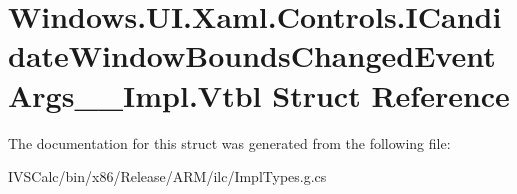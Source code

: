 \hypertarget{struct_windows_1_1_u_i_1_1_xaml_1_1_controls_1_1_i_candidate_window_bounds_changed_event_args_____impl_1_1_vtbl}{}\section{Windows.\+U\+I.\+Xaml.\+Controls.\+I\+Candidate\+Window\+Bounds\+Changed\+Event\+Args\+\_\+\+\_\+\+Impl.\+Vtbl Struct Reference}
\label{struct_windows_1_1_u_i_1_1_xaml_1_1_controls_1_1_i_candidate_window_bounds_changed_event_args_____impl_1_1_vtbl}


The documentation for this struct was generated from the following file\+:\begin{DoxyCompactItemize}
\item 
I\+V\+S\+Calc/bin/x86/\+Release/\+A\+R\+M/ilc/Impl\+Types.\+g.\+cs\end{DoxyCompactItemize}
